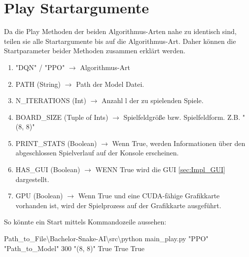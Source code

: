 \section{Play Startargumente}
Da die Play Methoden der beiden Algorithmus-Arten nahe zu identisch sind, teilen sie alle Startargumente bis auf die Algorithmus-Art. Daher können die Startparameter beider Methoden zusammen erklärt werden.
\begin{enumerate}
	\item "DQN" / "PPO" $\longrightarrow$ Algorithmus-Art	
	\item PATH (String) $\longrightarrow$ Path der Model Datei.
	\item N\_ITERATIONS (Int) $\longrightarrow$ Anzahl l der zu spielenden Spiele.
	\item BOARD\_SIZE (Tuple of Ints) $\longrightarrow$ Spielfeldgröße bzw. Spielfeldform. Z.B. "(8, 8)"
	\item PRINT\_STATS (Boolean) $\longrightarrow$ Wenn True, werden Informationen über den abgeschlossen Spielverlauf auf der Konsole erscheinen.
	\item HAS\_GUI (Boolean) $\longrightarrow$ WENN True wird die GUI \ref{sec:Impl_GUI} dargestellt.
	\item GPU (Boolean) $\longrightarrow$ Wenn True und eine CUDA-fähige Grafikkarte vorhanden ist, wird der Spielprozess auf der Grafikkarte ausgeführt.
\end{enumerate}
So könnte ein Start mittels Kommandozeile aussehen:
\begin{center}
	Path\_to\_File\textbackslash Bachelor-Snake-AI\textbackslash src\textbackslash python main\_play.py "PPO"{} "Path\_to\_Model"{} 300 "(8, 8)"{} True True True
\end{center}